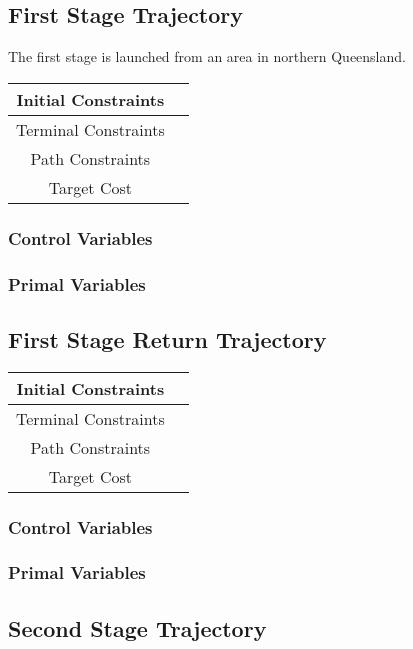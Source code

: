 \subsection{First Stage Trajectory}
The first stage is launched from an area in northern Queensland.

\begin{tabular}{|c|c|}
	\hline Initial Constraints  & \\ 
	\hline Terminal Constraints &  \\ 
	\hline Path Constraints &  \\ 
	\hline Target Cost &  \\ 
	\hline 
\end{tabular} 

\subsubsection{Control Variables}

\subsubsection{Primal Variables}

\subsection{First Stage Return Trajectory} 

\begin{tabular}{|c|c|}
	\hline Initial Constraints  & \\ 
	\hline Terminal Constraints &  \\ 
	\hline Path Constraints &  \\ 
	\hline Target Cost &  \\ 
	\hline 
\end{tabular} 

\subsubsection{Control Variables}

\subsubsection{Primal Variables}

\subsection{Second Stage Trajectory}

